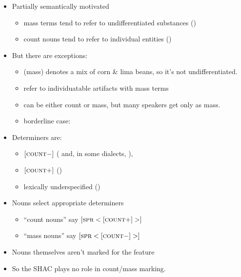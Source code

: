 \documentclass[a4paper,landscape,headrule,footrule]{foils}
\begin{document}
\begin{itemize}
\item Partially semantically motivated
\begin{itemize}
  \item mass terms tend to refer to undifferentiated substances ()
\item count nouns tend to refer to individual entities ()
\end{itemize}
\item But there are exceptions:
  \begin{itemize}
  \item {} (mass) denotes a mix of corn \& lima beans, so
it’s not undifferentiated.
  \item {} refer to individuatable
artifacts with mass terms
  \item {} can be either count or mass, but many speakers
get  only as mass.
  \item borderline case: 
  \end{itemize}
\end{itemize}


\begin{itemize}
\item Determiners are:
\begin{itemize}
  \item $[\textsc{count} -]$ ( and, in some dialects, ),
  \item $[\textsc{count} +]$ ()
  \item lexically underspecified ()
  \end{itemize}
\item Nouns select appropriate determiners
  \begin{itemize}
  \item “count nouns” say $[\textsc{spr} < [\textsc{count} +] >]$
  \item “mass nouns” say $[\textsc{spr} < [\textsc{count} -] >]$
  \end{itemize}
\item Nouns themselves aren’t marked for the feature 
\item So the SHAC plays no role in count/mass marking.
\end{itemize}
\end{document}
